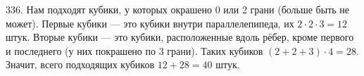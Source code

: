 336. Нам подходят кубики, у которых окрашено 0 или 2 грани (больше быть не может). Первые кубики --- это кубики внутри параллелепипеда, их $2\cdot2\cdot3=12$ штук. Вторые кубики --- это кубики, расположенные вдоль рёбер, кроме первого и последнего (у них покрашено по 3 грани). Таких кубиков $(2+2+3)\cdot4=28.$ Значит, всего подходящих кубиков $12+28=40$ штук.\\
